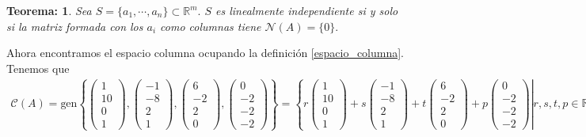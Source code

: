 \documentclass[11pt,letterpaper]{article}
\newcommand{\mR}{\mathbb{R}}
\newcommand{\gen}{\text{gen}}
\newtheorem{thmt}{Teorema:}
\begin{document}
\begin{enumerate}
\begin{framed}
    \begin{thmt} \label{linealemente_ind}
    Sea $S=\{a_1,\cdots ,a_n\}\subset \mR^m.$ $S$ es linealmente independiente si y solo si la matriz formada con los $a_i$ como columnas tiene $\mathcal{N}(A)=\{0\}.$
    \end{thmt}
\end{framed} 
Ahora encontramos el espacio columna ocupando la definición \ref{espacio_columna}. Tenemos que 
\begin{align*}
\mathcal{C}(A)=\gen \left\{\begin{pmatrix}
1\\
10\\
0\\
1
\end{pmatrix}, \begin{pmatrix}
-1\\
-8\\
2\\
1
\end{pmatrix},\begin{pmatrix}
6\\
-2\\
2\\
0
\end{pmatrix},\begin{pmatrix}
0\\
-2\\
-2\\
-2
\end{pmatrix}\right\}=\left\{  \left. r\begin{pmatrix}
1\\
10\\
0\\
1
\end{pmatrix}+s\begin{pmatrix}
-1\\
-8\\
2\\
1
\end{pmatrix}+t\begin{pmatrix}
6\\
-2\\
2\\
0
\end{pmatrix}+p\begin{pmatrix}
0\\
-2\\
-2\\
-2
\end{pmatrix} \right| r,s,t,p\in \mR \right\}.

\end{align*}
\end{enumerate}
\end{document}
